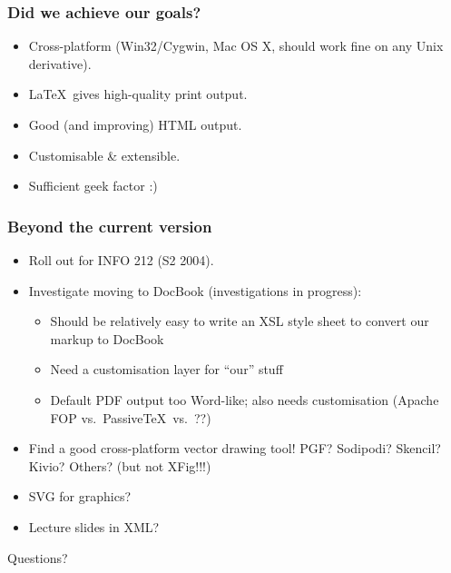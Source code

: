 \documentclass[pdftex]{beamer}
\begin{document}
\frame
{
	\frametitle{Did we achieve our goals?}
	
	\begin{itemize}
	
		\item Cross-platform (Win32/Cygwin, Mac OS X, should work fine
		on any Unix derivative).
		
		\item \LaTeX\ gives high-quality print output.
		
		\item Good (and improving) HTML output.
		
		\item Customisable \& extensible.
		
		\item Sufficient geek factor :)
		
	\end{itemize}
	
	\begin{center}
	
	
	\end{center}
}


\frame
{
	\frametitle{Beyond the current version}
	
	\begin{itemize}
	
		\item Roll out for INFO 212 (S2 2004).
		
		\item Investigate moving to DocBook (investigations in
		progress):
		
		\begin{itemize}
		
			\item Should be relatively easy to write an XSL style sheet
			to convert our markup to DocBook
			
			\item Need a customisation layer for ``our'' stuff
			
			\item Default PDF output too Word-like; also needs
			customisation (Apache FOP vs.\ Passive\TeX\ vs.\ ??)
			
		\end{itemize}
		
		\item Find a good cross-platform vector drawing tool! PGF?
		Sodipodi? Skencil? Kivio? Others? (but \alert{not} XFig!!!)
		
		\item SVG for graphics?
		
		\item Lecture slides in XML?
		
	
	\end{itemize}
}


\frame
{
	\centering\Huge{\alert{Questions?}}
}
\end{document}
